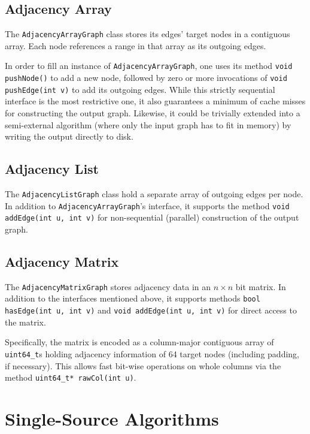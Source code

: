 \documentclass[12pt,a4paper,twoside]{article}
\begin{document}
\subsection{Adjacency Array}

The \verb|AdjacencyArrayGraph| class stores its edges' target nodes in a contiguous array. Each node references a range in that array as its outgoing edges.

In order to fill an instance of \verb|AdjacencyArrayGraph|, one uses its method \verb|void pushNode()| to add a new node, followed by zero or more invocations of \verb|void pushEdge(int v)| to add its outgoing edges. While this strictly sequential interface is the most restrictive one, it also guarantees a minimum of cache misses for constructing the output graph. Likewise, it could be trivially extended into a semi-external algorithm (where only the input graph has to fit in memory) by writing the output directly to disk.

\subsection{Adjacency List}

The \verb|AdjacencyListGraph| class hold a separate array of outgoing edges per node. In addition to \verb|AdjacencyArrayGraph|'s interface, it supports the method \verb|void addEdge(int u, int v)| for non-sequential (\eg parallel) construction of the output graph.

\subsection{Adjacency Matrix}

The \verb|AdjacencyMatrixGraph| stores adjacency data in an $n \times n$ bit matrix. In addition to the interfaces mentioned above, it supports methods \verb|bool hasEdge(int u, int v)| and \verb|void addEdge(int u, int v)| for direct access to the matrix.

Specifically, the matrix is encoded as a column-major contiguous array of \verb|uint64_t|s holding adjacency information of 64 target nodes (including padding, if necessary). This allows fast bit-wise operations on whole columns via the method \verb|uint64_t* rawCol(int u)|.

\section{Single-Source Algorithms}
\end{document}
